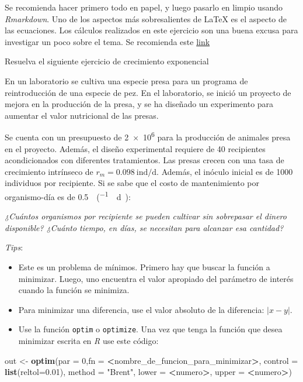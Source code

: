 \documentclass[12pt,letterpaper,]{book}
\newenvironment{Shaded}{\begin{snugshade}}{\end{snugshade}}
\newcommand{\KeywordTok}[1]{\textcolor[rgb]{0.13,0.29,0.53}{\textbf{#1}}}
\newcommand{\DataTypeTok}[1]{\textcolor[rgb]{0.13,0.29,0.53}{#1}}
\newcommand{\DecValTok}[1]{\textcolor[rgb]{0.00,0.00,0.81}{#1}}
\newcommand{\FloatTok}[1]{\textcolor[rgb]{0.00,0.00,0.81}{#1}}
\newcommand{\StringTok}[1]{\textcolor[rgb]{0.31,0.60,0.02}{#1}}
\newcommand{\OperatorTok}[1]{\textcolor[rgb]{0.81,0.36,0.00}{\textbf{#1}}}
\newcommand{\NormalTok}[1]{#1}
\let\BeginKnitrBlock\begin \let\EndKnitrBlock\end
\begin{document}
Se recomienda hacer primero todo en papel, y luego pasarlo en limpio
usando \emph{Rmarkdown}. Uno de los aspectos más sobresalientes de LaTeX
es el aspecto de las ecuaciones. Los cálculos realizados en este
ejercicio son una buena excusa para investigar un poco sobre el tema. Se
recomienda este
\href{https://en.wikibooks.org/wiki/LaTeX/Mathematics}{link}

\setcounter{exercise}{0}

\BeginKnitrBlock{exercise}
\protect\hypertarget{exr:T02E01}{}{\label{exr:T02E01} }Resuelva el siguiente
ejercicio de crecimiento exponencial
\EndKnitrBlock{exercise}

En un laboratorio se cultiva una especie presa para un programa de
reintroducción de una especie de pez. En el laboratorio, se inició un
proyecto de mejora en la producción de la presa, y se ha diseñado un
experimento para aumentar el valor nutricional de las presas.

Se cuenta con un presupuesto de \SI{2e6}{} para la producción
de animales presa en el proyecto. Además, el diseño experimental
requiere de 40 recipientes acondicionados con diferentes tratamientos.
Las presas crecen con una tasa de crecimiento intrínseco de
\(r_m = \SI{0.098}{\text{ind}\per\day}\). Además, el inóculo inicial es
de \num{1000} individuos por recipiente. Si se sabe que el costo de
mantenimiento por organismo-día es de
\SI{0.5}{\per(.\day)}:

\emph{¿Cuántos organismos por recipiente se pueden cultivar sin
sobrepasar el dinero disponible? ¿Cuánto tiempo, en días, se necesitan
para alcanzar esa cantidad?}

\emph{Tips}:

\begin{itemize}
\item
  Este es un problema de mínimos. Primero hay que buscar la función a
  minimizar. Luego, uno encuentra el valor apropiado del parámetro de
  interés cuando la función se minimiza.
\item
  Para minimizar una diferencia, use el valor absoluto de la diferencia:
  \(\left| x - y\right|\).
\item
  Use la función \texttt{optim} o \texttt{optimize}. Una vez que tenga
  la función que desea minimizar escrita en \emph{R} use este código:
\end{itemize}

\begin{Shaded}
\begin{Highlighting}[]
\NormalTok{out <-}\StringTok{ }\KeywordTok{optim}\NormalTok{(}\DataTypeTok{par =} \DecValTok{0}\NormalTok{,}\DataTypeTok{fn =} \OperatorTok{<}\NormalTok{nombre_de_funcion_para_minimizar}\OperatorTok{>}\NormalTok{,}
      \DataTypeTok{control =} \KeywordTok{list}\NormalTok{(}\DataTypeTok{reltol=}\FloatTok{0.01}\NormalTok{),}
      \DataTypeTok{method =} \StringTok{"Brent"}\NormalTok{, }
      \DataTypeTok{lower =} \OperatorTok{<}\NormalTok{numero}\OperatorTok{>}\NormalTok{, }
      \DataTypeTok{upper =} \OperatorTok{<}\NormalTok{numero}\OperatorTok{>}\NormalTok{)}
\end{Highlighting}
\end{Shaded}
\end{document}
